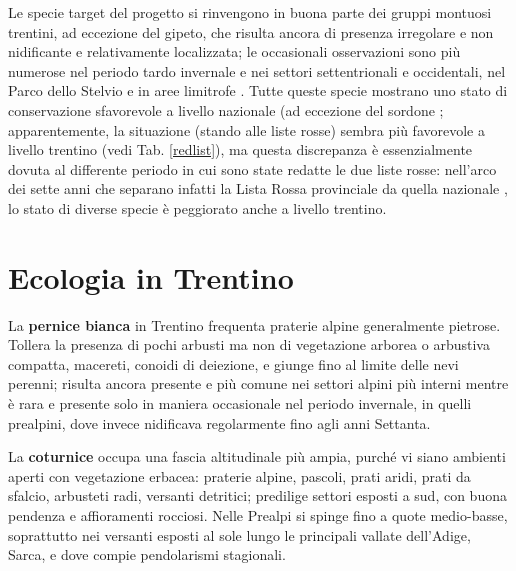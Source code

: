 \documentclass[10pt,twoside,openany,x11names,svgnames,italian,a5paper,dvipsnames,table]{memoir}
\begin{document}
Le specie target del progetto si rinvengono in buona parte dei gruppi montuosi trentini, ad eccezione del gipeto, che risulta ancora di presenza irregolare e non nidificante e relativamente localizzata; le occasionali osservazioni sono più numerose nel periodo tardo invernale e nei settori settentrionali e occidentali, nel Parco dello Stelvio e in aree limitrofe \cite{Pedrini05}.
Tutte queste specie mostrano uno stato di conservazione sfavorevole a livello nazionale (ad eccezione del sordone \cite{Gustin09} \cite{Gustin10}; apparentemente, la situazione (stando alle liste rosse) sembra più favorevole a livello trentino (vedi Tab. \ref{redlist}), ma questa discrepanza è essenzialmente dovuta al differente periodo in cui sono state redatte le due liste rosse: nell'arco dei sette anni che separano infatti la Lista Rossa provinciale \cite{Pedrini05} da quella nazionale \cite{Peronace12}, lo stato di diverse specie è peggiorato anche a livello trentino.


\section{Ecologia in Trentino}
La \textbf{pernice bianca} in Trentino frequenta praterie alpine generalmente pietrose. Tollera la presenza di pochi arbusti ma non di vegetazione arborea o arbustiva compatta, macereti, conoidi di deiezione, e giunge fino al limite delle nevi perenni; risulta ancora presente e più comune nei settori alpini più interni mentre è rara e presente solo in maniera occasionale nel periodo invernale, in quelli prealpini, dove invece nidificava regolarmente fino agli anni Settanta.

La \textbf{coturnice} occupa una fascia altitudinale più ampia, purché vi siano ambienti aperti con vegetazione erbacea: praterie alpine, pascoli, prati aridi, prati da sfalcio, arbusteti radi, versanti detritici; predilige settori esposti a sud, con buona pendenza e affioramenti rocciosi. Nelle Prealpi si spinge fino a quote medio-basse, soprattutto nei versanti esposti al sole lungo le principali vallate dell’Adige, Sarca, e dove compie pendolarismi stagionali.
\end{document}
